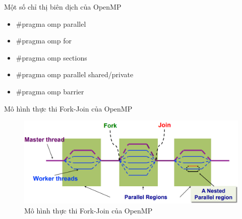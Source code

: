 \documentclass[10pt]{beamer}
\theoremstyle{remark}
\numberwithin{algocf}{section}
\numberwithin{equation}{section}
\numberwithin{dl}{section}
\numberwithin{figure}{section}
\begin{document}
\begin{frame}{Một số chỉ thị biên dịch của OpenMP}
    \begin{itemize}
        \item \#pragma omp parallel
        \item \#pragma omp for
        \item \#pragma omp sections
        \item \#pragma omp parallel shared/private
        \item \#pragma omp barrier
    \end{itemize}
\end{frame}

\begin{frame}{Mô hình thực thi Fork-Join của OpenMP}
    \begin{figure}[H]
        \centering
        \includegraphics[width=\linewidth]{figures/OpenMP/Fork_Join_Execution_Model.png}
        \caption{Mô hình thực thi Fork-Join của OpenMP}
    \end{figure}
\end{frame}
\end{document}
